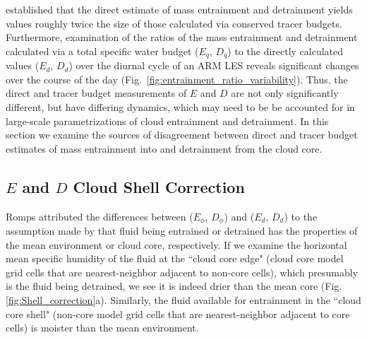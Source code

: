 \documentclass[12pt]{article}
\begin{document}
\cite{Romps2010} established that the direct estimate of mass entrainment 
and detrainment yields values roughly twice the size of those calculated 
via conserved tracer budgets.  Furthermore, examination of the ratios of 
the mass entrainment and detrainment calculated via a total specific 
water budget ($E_q$, $D_q$) to the directly calculated values 
($E_d$, $D_d$) over the diurnal cycle of an ARM LES reveals significant 
changes over the course of the day 
(Fig.~\ref{fig:entrainment_ratio_variability}).  Thus, the direct and 
tracer budget measurements of $E$ and $D$ are not only significantly
different, but have differing dynamics, which may need to be be accounted 
for in large-scale parametrizations of cloud entrainment and detrainment.  
In this section we examine the sources of disagreement between direct and 
tracer budget estimates of mass entrainment into and detrainment from the 
cloud core.


\subsection{$E$ and $D$ Cloud Shell Correction}

Romps attributed the differences between ($E_{\phi}$, $D_{\phi}$)
and ($E_d$, $D_d$) to the assumption made by \cite{Siebesma1995} that
fluid being entrained or detrained has the properties of the mean
environment or cloud core, respectively.  If we examine the horizontal 
mean specific humidity of the fluid at the ``cloud core edge" (cloud 
core model grid cells that are nearest-neighbor adjacent to non-core 
cells), which presumably is the fluid being detrained, we see it is 
indeed drier than the mean core (Fig. \ref{fig:Shell_correction}a).  
Similarly, the fluid available for entrainment in the ``cloud core shell" 
(non-core model grid cells that are nearest-neighbor adjacent to core 
cells) is moister than the mean environment.
\end{document}

